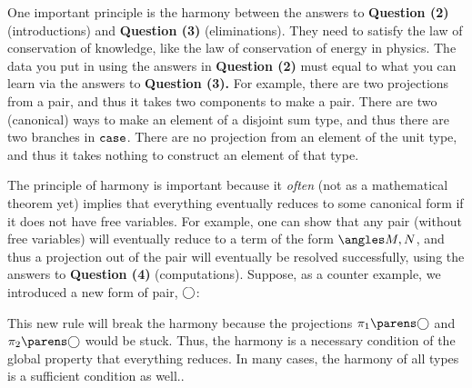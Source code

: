 \documentclass[11pt]{article}
\begin{document}
One important principle is the harmony between the answers to \textbf{Question (2)} (introductions) and \textbf{Question (3)} (eliminations). They need to satisfy the law of conservation of knowledge, like the law of conservation of energy in physics. The data you put in using the answers in \textbf{Question (2)} must equal to what you can learn via the answers to \textbf{Question (3).} For example, there are two projections from a pair, and thus it takes two components to make a pair. There are two (canonical) ways to make an element of a disjoint sum type, and thus there are two branches in $\sumcase$. There are no projection from an element of the unit type, and thus it takes nothing to construct an element of that type.

\NewDocumentCommand{\alianpair}{}{\bigcirc}

The principle of harmony is important because it \emph{often} (not as a mathematical theorem yet) implies that everything eventually reduces to some canonical form if it does not have free variables. For example, one can show that any pair (without free variables) will eventually reduce to a term of the form $\pair{M}{N}$, and thus a projection out of the pair will eventually be resolved successfully, using the answers to \textbf{Question (4)} (computations). Suppose, as a counter example, we introduced a new form of pair, $\alianpair$:
\begin{prooftree*}
\end{prooftree*}
This new rule will break the harmony because the projections $\pairfst{\alianpair}$ and $\pairsnd{\alianpair}$ would be stuck. Thus, the harmony is a necessary condition of the global property that everything reduces. In many cases, the harmony of all types is a sufficient condition as well..

\printbibliography
\end{document}
